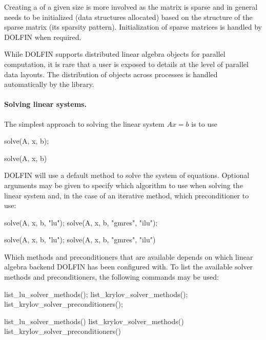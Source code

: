 Creating a  of a given size is more involved as the matrix
is sparse and in general needs to be initialized (data structures
allocated) based on the structure of the sparse matrix (its sparsity
pattern). Initialization of sparse matrices is handled by DOLFIN when
required.

While DOLFIN supports distributed linear algebra objects for parallel
computation, it is rare that a user is exposed to details at the level
of parallel data layouts. The distribution of objects across processes
is handled automatically by the library.

\paragraph{Solving linear systems.}

The simplest approach to solving the linear system $Ax = b$ is to use
%
\begin{c++}
solve(A, x, b);
\end{c++}
%
\begin{python}
solve(A, x, b)
\end{python}
%
DOLFIN will use a default method to solve the system of equations.
Optional arguments may be given to specify which algorithm to use when
solving the linear system and, in the case of an iterative method,
which preconditioner to use:
%
\begin{c++}
solve(A, x, b, "lu");
solve(A, x, b, "gmres", "ilu");
\end{c++}
%
\begin{python}
solve(A, x, b, "lu");
solve(A, x, b, "gmres", "ilu")
\end{python}
%
Which methods and preconditioners that are available depends on which
linear algebra backend DOLFIN has been configured with. To list the
available solver methods and preconditioners, the following commands
may be used:
%
\begin{c++}
list_lu_solver_methods();
list_krylov_solver_methods();
list_krylov_solver_preconditioners();
\end{c++}
%
\begin{python}
list_lu_solver_methods()
list_krylov_solver_methods()
list_krylov_solver_preconditioners()
\end{python}


